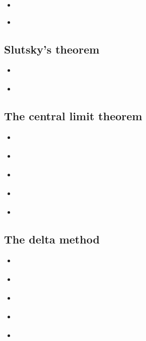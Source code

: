 \documentclass{report}
\begin{document}
\begin{itemize}
    \item \cite[Chapter~2.1]{van_der_vaart_asymptotic_1998}
    \item \cite[Chapter~1.3]{dasgupta_asymptotic_2008}
\end{itemize}

\subsection{Slutsky's theorem}

\begin{itemize}
    \item \cite[Chapter~2.1]{van_der_vaart_asymptotic_1998}
    \item \cite[Chapter~1.1]{dasgupta_asymptotic_2008}
\end{itemize}

\subsection{The central limit theorem}

\begin{itemize}
    \item \cite[Chapter~2.1]{van_der_vaart_asymptotic_1998}
    \item \cite[Chapter~1.3]{dasgupta_asymptotic_2008}
    \item \cite[Chapter~5.5]{casella_statistical_2002}
    \item \cite[Chapter~2.4]{lehmann_elements_1999}
    \item \cite[Chapter~1.9]{serfling_approximation_1980}
\end{itemize}

\subsection{The delta method}

\begin{itemize}
    \item \cite[Chapter~3.1]{van_der_vaart_asymptotic_1998}
    \item \cite[Chapter~3.4]{dasgupta_asymptotic_2008}
    \item \cite[Chapter~5.5]{casella_statistical_2002}
    \item \cite[Chapter~2.5]{lehmann_elements_1999}
    \item \cite[Chapter~3.1]{serfling_approximation_1980}
\end{itemize}
\end{document}
